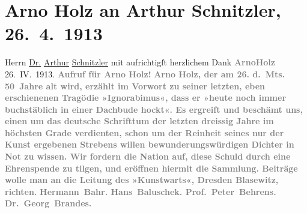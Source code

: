 

               \section[Arno Holz an Arthur Schnitzler, 26. 4. 1913]{ Arno Holz an Arthur Schnitzler, 26. 4. 1913}\nopagebreak{}\rehead{ }\begin{ledgroupsized}[t]{13cm}\normalsize\beginnumbering{} \toendnotes[C]{\smallbreak\pagebreak[2]} 
\pstart
           \noindent{}{\pb}Herrn\pend
           \pstart
           \uline{Dr.}{ }\uline{Arthur}{ }\uline{Schnitzler}\pend
           \pstart
           mit aufrichtigſt herzlichem Dank\pend
           \pstart
           \centering{}\textcolor{gray}{\textbf{ArnoHolz}}\pend
           \pstart
           \noindent{}\centering{}26. IV. 1913.\pend
           \pstart
           \noindent{}\centering{}{\pb}\textcolor{gray}{\textbf{Aufruf für Arno Holz!}}\pend
           \pstart
           \noindent{}\textcolor{gray}{\textbf{Arno Holz, der am 26. d. Mts. 50 Jahre alt
                        wird, erzählt im Vorwort zu seiner letzten, eben erschienenen Tragödie »Ignorabimus«, dass er »heute noch immer
                        buchstäblich in einer Dachbude hockt«. Es ergreift und beschämt uns, einen
                        um das deutsche Schrifttum der letzten dreissig Jahre im höchsten Grade
                        verdienten, schon um der Reinheit seines nur der Kunst ergebenen Strebens
                        willen bewunderungswürdigen Dichter in Not zu wissen. Wir fordern die Nation
                        auf, diese Schuld durch eine Ehrenspende zu tilgen, und eröffnen hiermit die
                        Sammlung. Beiträge wolle man an die Leitung des »Kunstwarts«, Dresden Blasewitz,
                        richten.}}\pend
           \pstart
           \centering{}\textcolor{gray}{\textbf{\textbf{Hermann Bahr. Hans Baluschek. Prof. Peter Behrens.}{ }\textbf{Dr. Georg Brandes.
}}}
\end{ledgroupsized}
